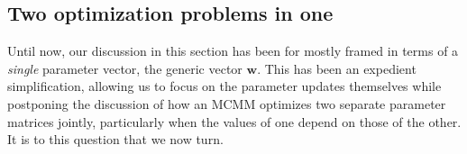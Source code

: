 
\subsection{Two optimization problems in one}
\label{sec:two-in-one}
Until now, our discussion in this section has been for mostly framed in terms of a 
\emph{single} parameter vector, the generic vector $\textbf{w}$. 
This has been an expedient simplification, allowing us to focus on the parameter 
updates themselves while postponing
the discussion of how an MCMM optimizes two separate parameter matrices
jointly, particularly when the values of one depend on those of the other. 
It is to this question that we now turn.

